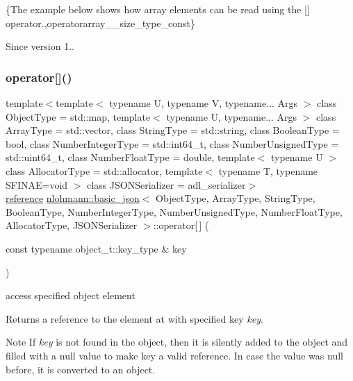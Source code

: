 \{The example below shows how array elements can be read using the {\ttfamily \mbox{[}\mbox{]}} operator.,operatorarray\+\_\+\+\_\+size\+\_\+type\+\_\+const\}

\begin{DoxySince}{Since}
version 1.. 
\end{DoxySince}
\mbox{\label{classnlohmann_1_1basic__json_a233b02b0839ef798942dd46157cc0fe6}} 
\subsubsection{\texorpdfstring{operator[]()}{operator[]()}\hspace{0.1cm}{\footnotesize\ttfamily [3/8]}}
{\footnotesize\ttfamily template$<$template$<$ typename U, typename V, typename... Args $>$ class Object\+Type = std\+::map, template$<$ typename U, typename... Args $>$ class Array\+Type = std\+::vector, class String\+Type  = std\+::string, class Boolean\+Type  = bool, class Number\+Integer\+Type  = std\+::int64\+\_\+t, class Number\+Unsigned\+Type  = std\+::uint64\+\_\+t, class Number\+Float\+Type  = double, template$<$ typename U $>$ class Allocator\+Type = std\+::allocator, template$<$ typename T, typename S\+F\+I\+N\+A\+E=void $>$ class J\+S\+O\+N\+Serializer = adl\+\_\+serializer$>$ \\
\mbox{\hyperlink{classnlohmann_1_1basic__json_ac6a5eddd156c776ac75ff54cfe54a5bc}{reference}} \mbox{\hyperlink{classnlohmann_1_1basic__json}{nlohmann\+::basic\+\_\+json}}$<$ Object\+Type, Array\+Type, String\+Type, Boolean\+Type, Number\+Integer\+Type, Number\+Unsigned\+Type, Number\+Float\+Type, Allocator\+Type, J\+S\+O\+N\+Serializer $>$\+::operator\mbox{[}$\,$\mbox{]} (\begin{DoxyParamCaption}\item[{const typename object\+\_\+t\+::key\+\_\+type \&}]{key }\end{DoxyParamCaption})\hspace{0.3cm}{\ttfamily [inline]}}



access specified object element 

Returns a reference to the element at with specified key {\itshape key}.

\begin{DoxyNote}{Note}
If {\itshape key} is not found in the object, then it is silently added to the object and filled with a {\ttfamily null} value to make {\ttfamily key} a valid reference. In case the value was {\ttfamily null} before, it is converted to an object.
\end{DoxyNote}

